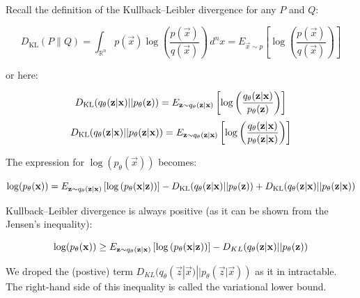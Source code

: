 \documentclass[12pt, a4paper]{article}
\begin{document}
Recall the definition of the Kullback–Leibler divergence for any $P$ and $Q$:

$$
D_\text{KL}(P \parallel Q) = \int_{\mathbb{R}^n} p(\vec x) \log\left(\frac{p(\vec x)}{q(\vec x)}\right)\, d^n x = E_{\vec x \sim p}
\left[ \log\left(\frac{p(\vec x)}{q(\vec x)}\right)  \right]
$$

or here:

$$
D_\text{KL}( q_\theta(\mathbf z | \mathbf x) || p_\theta(\mathbf z)) =  E_{\mathbf z \sim q_\theta(\mathbf z | \mathbf x)}\left[\log\left( \frac{ q_\theta(\mathbf z | \mathbf x) }{ p_\theta(\mathbf z) } \right) \right]
$$
$$
D_\text{KL}(q_\theta(\mathbf z | \mathbf x) || p_\theta(\mathbf z | \mathbf x)) = 
E_{\mathbf z \sim q_\theta(\mathbf z | \mathbf x)}\left[\log\left( \frac{ q_\theta(\mathbf z | \mathbf x) }{p_\theta(\mathbf z | \mathbf x)} \right) \right]
$$


The expression for $\log( p_\theta(\vec x))$ becomes:

$$
\log( p_\theta(\mathbf x))  = 
E_{\mathbf z \sim q_\theta(\mathbf z | \mathbf x)}\left[\log\left( p_\theta(\mathbf x | \mathbf z) \right) \right]
- D_\text{KL}( q_\theta(\mathbf z | \mathbf x) || p_\theta(\mathbf z))
+ D_\text{KL}(q_\theta(\mathbf z | \mathbf x) || p_\theta(\mathbf z | \mathbf x))
$$


Kullback–Leibler divergence is always positive (as it can be shown from the Jensen's inequality):


$$
\log( p_\theta(\mathbf x))  \ge 
E_{\mathbf z \sim q_\theta(\mathbf z | \mathbf x)}\left[\log\left( p_\theta(\mathbf x | \mathbf z) \right) \right]
- D_{KL}( q_\theta(\mathbf z | \mathbf x) || p_\theta(\mathbf z))
$$

We droped the (postive) term $D_{KL}(q_\theta(\vec z | \vec x) || p_\theta(\vec z | \vec x))$ as it in intractable. The right-hand side of this inequality is called the variational lower bound.
\end{document}
